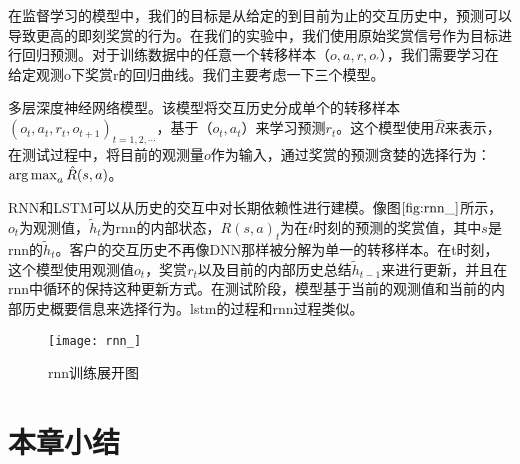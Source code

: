 在监督学习的模型中，我们的目标是从给定的到目前为止的交互历史中，预测可以导致更高的即刻奖赏的行为。在我们的实验中，我们使用原始奖赏信号作为目标进行回归预测。对于训练数据中的任意一个转移样本（$o,a,r,o_{'}$），我们需要学习在给定观测o下奖赏r的回归曲线。我们主要考虑一下三个模型。

多层深度神经网络模型。该模型将交互历史分成单个的转移样本${(o_{t}, a_{t}, r_{t}, o_{t+1})}_{t=1,2,\cdots}$，基于（$o_{t},a_{t}$）来学习预测$r_{t}$。这个模型使用$\hat{R}$来表示，在测试过程中，将目前的观测量$o$作为输入，通过奖赏的预测贪婪的选择行为：$\operatorname*{arg\,max}_{a}\hat{R}(s,a)$。

RNN和LSTM可以从历史的交互中对长期依赖性进行建模。像图$\ref{fig:rnn_}$所示，$o_{t}$为观测值，$\tilde{h}_{t}$为rnn的内部状态，$R(s,a)_{t}$为在$t$时刻的预测的奖赏值，其中$s$是rnn的$\tilde{h}_{t}$。客户的交互历史不再像DNN那样被分解为单一的转移样本。在t时刻，这个模型使用观测值$o_{t}$，奖赏$r_{t}$以及目前的内部历史总结$\tilde{h}_{t-1}$来进行更新，并且在rnn中循环的保持这种更新方式。在测试阶段，模型基于当前的观测值和当前的内部历史概要信息来选择行为。lstm的过程和rnn过程类似。
\begin{figure}[htbp]
\centering
\texttt{[image: rnn\_]}
\caption{rnn训练展开图}
\label{fig:rnn_}
\end{figure}

\section{本章小结}